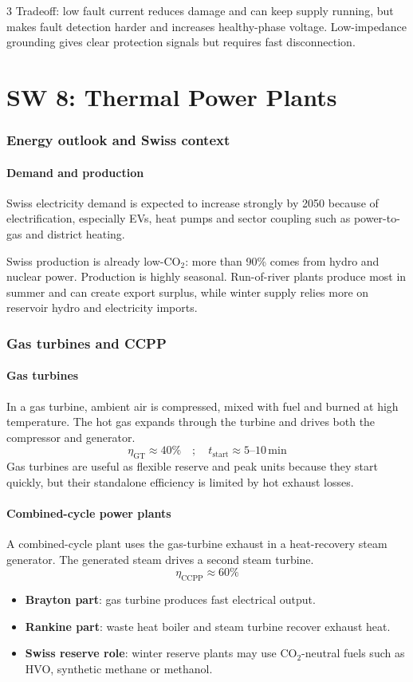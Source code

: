 \documentclass[9pt, landscape, a4paper]{article}
\begin{document}
\begin{multicols*}{3}
Tradeoff: low fault current reduces damage and can keep supply running, but
makes fault detection harder and increases healthy-phase voltage. Low-impedance
grounding gives clear protection signals but requires fast disconnection.

\part{SW 8: Thermal Power Plants}
\section{Energy outlook and Swiss context}
\subsection{Demand and production}
Swiss electricity demand is expected to increase strongly by 2050 because of
electrification, especially EVs, heat pumps and sector coupling such as
power-to-gas and district heating.

Swiss production is already low-CO$_2$: more than 90\% comes from hydro and
nuclear power. Production is highly seasonal. Run-of-river plants produce most
in summer and can create export surplus, while winter supply relies more on
reservoir hydro and electricity imports.

\section{Gas turbines and CCPP}
\subsection{Gas turbines}
In a gas turbine, ambient air is compressed, mixed with fuel and burned at high
temperature. The hot gas expands through the turbine and drives both the
compressor and generator.
\[
  \eta_{\mathrm{GT}}\approx40\%
  \quad ; \quad
  t_{\mathrm{start}}\approx5\text{--}10\,\mathrm{min}
\]
Gas turbines are useful as flexible reserve and peak units because they start
quickly, but their standalone efficiency is limited by hot exhaust losses.

\subsection{Combined-cycle power plants}
A combined-cycle plant uses the gas-turbine exhaust in a heat-recovery steam
generator. The generated steam drives a second steam turbine.
\[
  \eta_{\mathrm{CCPP}}\approx60\%
\]
\begin{itemize}
  \item \textbf{Brayton part}: gas turbine produces fast electrical output.
  \item \textbf{Rankine part}: waste heat boiler and steam turbine recover exhaust heat.
  \item \textbf{Swiss reserve role}: winter reserve plants may use
        CO$_2$-neutral fuels such as HVO, synthetic methane or methanol.
\end{itemize}


\end{multicols*}
\end{document}
